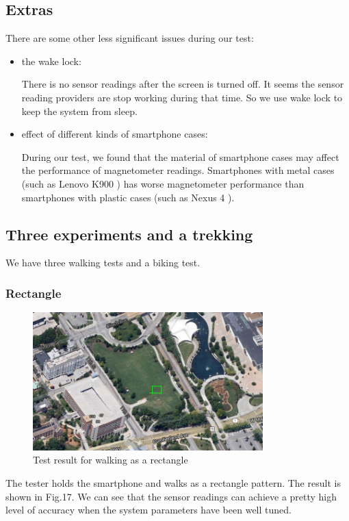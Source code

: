 \documentclass[journal]{IEEEtran}
\begin{document}
\subsection{Extras}
There are some other less significant issues during our test:
\begin{itemize}
	\item the wake lock: 

		There is no sensor readings after the screen is turned off.
		It seems the sensor reading providers are stop working during that time.
		So we use wake lock to keep the system from sleep.
	\item effect of different kinds of smartphone cases: 

		During our test, we found that the material of smartphone cases may affect the performance of magnetometer readings.
		Smartphones with metal cases (such as Lenovo K900 \cite{K900}) has worse magnetometer performance than smartphones with plastic cases (such as Nexus 4 \cite{Nexus 4}).
\end{itemize}

\subsection{Three experiments and a trekking}
We have three walking tests and a biking test.

\subsubsection{Rectangle}
\begin{figure}
	\centering
	\includegraphics[width=3.5in]{figures/1-rect}
	\caption{Test result for walking as a rectangle}
\end{figure}

The tester holds the smartphone and walks as a rectangle pattern.
The result is shown in Fig.17.
We can see that the sensor readings can achieve a pretty high level of accuracy when the system parameters have been well tuned.
\end{document}
